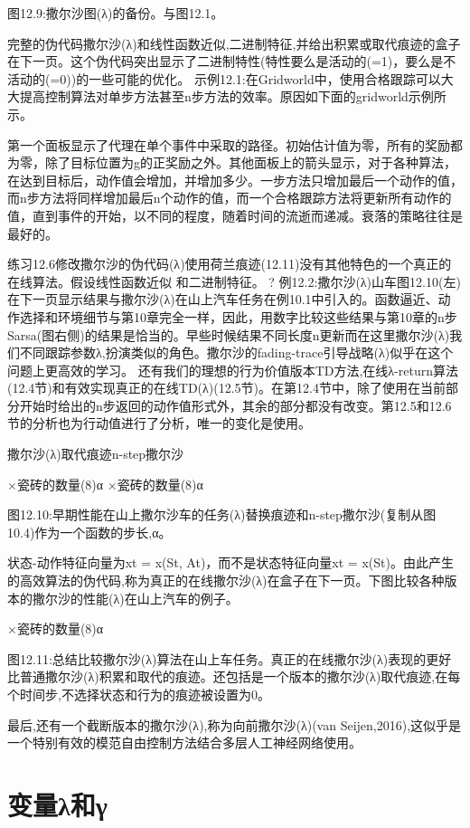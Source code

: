 图12.9:撒尔沙图(λ)的备份。与图12.1。

完整的伪代码撒尔沙(λ)和线性函数近似,二进制特征,并给出积累或取代痕迹的盒子在下一页。这个伪代码突出显示了二进制特性(特性要么是活动的(=1)，要么是不活动的(=0))的一些可能的优化。
示例12.1:在Gridworld中，使用合格跟踪可以大大提高控制算法对单步方法甚至n步方法的效率。原因如下面的gridworld示例所示。
 
第一个面板显示了代理在单个事件中采取的路径。初始估计值为零，所有的奖励都为零，除了目标位置为g的正奖励之外。其他面板上的箭头显示，对于各种算法，在达到目标后，动作值会增加，并增加多少。一步方法只增加最后一个动作的值，而n步方法将同样增加最后n个动作的值，而一个合格跟踪方法将更新所有动作的值，直到事件的开始，以不同的程度，随着时间的流逝而递减。衰落的策略往往是最好的。

练习12.6修改撒尔沙的伪代码(λ)使用荷兰痕迹(12.11)没有其他特色的一个真正的在线算法。假设线性函数近似
和二进制特征。 					?
例12.2:撒尔沙(λ)山车图12.10(左)在下一页显示结果与撒尔沙(λ)在山上汽车任务在例10.1中引入的。函数逼近、动作选择和环境细节与第10章完全一样，因此，用数字比较这些结果与第10章的n步Sarsa(图右侧)的结果是恰当的。早些时候结果不同长度n更新而在这里撒尔沙(λ)我们不同跟踪参数λ,扮演类似的角色。撒尔沙的fading-trace引导战略(λ)似乎在这个问题上更高效的学习。
还有我们的理想的行为价值版本TD方法,在线λ-return算法(12.4节)和有效实现真正的在线TD(λ)(12.5节)。在第12.4节中，除了使用在当前部分开始时给出的n步返回的动作值形式外，其余的部分都没有改变。第12.5和12.6节的分析也为行动值进行了分析，唯一的变化是使用。

撒尔沙(λ)取代痕迹n-step撒尔沙
 
×瓷砖的数量(8)α 					×瓷砖的数量(8)α

图12.10:早期性能在山上撒尔沙车的任务(λ)替换痕迹和n-step撒尔沙(复制从图10.4)作为一个函数的步长,α。

状态-动作特征向量为xt = x(St, At)，而不是状态特征向量xt = x(St)。由此产生的高效算法的伪代码,称为真正的在线撒尔沙(λ)在盒子在下一页。下图比较各种版本的撒尔沙的性能(λ)在山上汽车的例子。
 
×瓷砖的数量(8)α

图12.11:总结比较撒尔沙(λ)算法在山上车任务。真正的在线撒尔沙(λ)表现的更好比普通撒尔沙(λ)积累和取代的痕迹。还包括是一个版本的撒尔沙(λ)取代痕迹,在每个时间步,不选择状态和行为的痕迹被设置为0。

最后,还有一个截断版本的撒尔沙(λ),称为向前撒尔沙(λ)(van Seijen,2016),这似乎是一个特别有效的模范自由控制方法结合多层人工神经网络使用。

\section{变量λ和γ}

